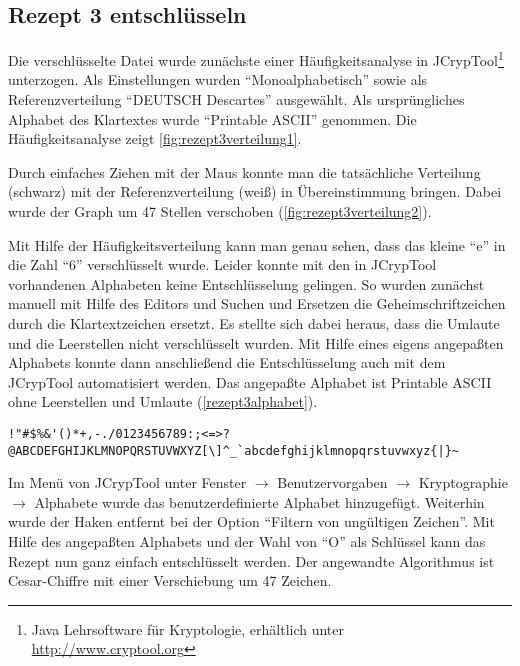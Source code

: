 \subsection{Rezept 3 entschlüsseln}
\label{RezeptDreiEntschluesseln}

Die verschlüsselte Datei wurde zunächste einer Häufigkeitsanalyse in
JCrypTool\footnote{Java Lehrsoftware für Kryptologie, erhältlich unter
  \url{http://www.cryptool.org}} unterzogen. Als Einstellungen wurden
``Monoalphabetisch'' sowie als Referenzverteilung ``DEUTSCH Descartes''
ausgewählt. Als ursprüngliches Alphabet des Klartextes wurde ``Printable ASCII''
genommen. Die Häufigkeitsanalyse zeigt \cref{fig:rezept3verteilung1}.


Durch einfaches Ziehen mit der Maus konnte man die tatsächliche Verteilung
(schwarz) mit der Referenzverteilung (weiß) in Übereinstimmung bringen. Dabei
wurde der Graph um 47 Stellen verschoben (\cref{fig:rezept3verteilung2}).


Mit Hilfe der Häufigkeitsverteilung kann man genau sehen, dass das kleine ``e''
in die Zahl ``6'' verschlüsselt wurde. Leider konnte mit den in JCrypTool
vorhandenen Alphabeten keine Entschlüsselung gelingen. So wurden zunächst
manuell mit Hilfe des Editors und Suchen und Ersetzen die Geheimschriftzeichen
durch die Klartextzeichen ersetzt. Es stellte sich dabei heraus, dass die
Umlaute und die Leerstellen nicht verschlüsselt wurden. Mit Hilfe eines eigens
angepaßten Alphabets konnte dann anschließend die Entschlüsselung auch mit dem
JCrypTool automatisiert werden. Das angepaßte Alphabet ist Printable ASCII ohne
Leerstellen und Umlaute (\cref{rezept3alphabet}).

\begin{lstlisting}[label=rezept3alphabet]
!"#$%&'()*+,-./0123456789:;<=>?
@ABCDEFGHIJKLMNOPQRSTUVWXYZ[\]^_`abcdefghijklmnopqrstuvwxyz{|}~
\end{lstlisting}

Im Menü von JCrypTool unter Fenster $\rightarrow$ Benutzervorgaben $\rightarrow$
Kryptographie $\rightarrow$ Alphabete wurde das benutzerdefinierte Alphabet
hinzugefügt. Weiterhin wurde der Haken entfernt bei der Option ``Filtern von
ungültigen Zeichen''.  Mit Hilfe des angepaßten Alphabets und der Wahl von ``O''
als Schlüssel kann das Rezept nun ganz einfach entschlüsselt werden.  Der
angewandte Algorithmus ist Cesar-Chiffre mit einer Verschiebung um 47 Zeichen.
